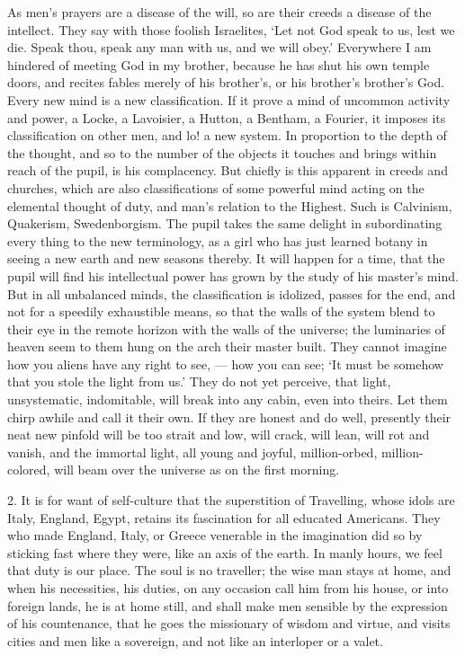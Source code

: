 \documentclass{article}
\begin{document}
As men's prayers are a disease of the will, so are their creeds a disease of
the intellect. They say with those foolish Israelites, `Let not God speak to
us, lest we die. Speak thou, speak any man with us, and we will obey.'
Everywhere I am hindered of meeting God in my brother, because he has shut
his own temple doors, and recites fables merely of his brother's, or his
brother's brother's God. Every new mind is a new classification. If it prove
a mind of uncommon activity and power, a Locke, a Lavoisier, a Hutton, a
Bentham, a Fourier, it imposes its classification on other men, and lo! a
new system. In proportion to the depth of the thought, and so to the number
of the objects it touches and brings within reach of the pupil, is his
complacency. But chiefly is this apparent in creeds and churches, which are
also classifications of some powerful mind acting on the elemental thought
of duty, and man's relation to the Highest. Such is Calvinism, Quakerism,
Swedenborgism. The pupil takes the same delight in subordinating every thing
to the new terminology, as a girl who has just learned botany in seeing a
new earth and new seasons thereby. It will happen for a time, that the pupil
will find his intellectual power has grown by the study of his master's
mind. But in all unbalanced minds, the classification is idolized, passes
for the end, and not for a speedily exhaustible means, so that the walls of
the system blend to their eye in the remote horizon with the walls of the
universe; the luminaries of heaven seem to them hung on the arch their
master built. They cannot imagine how you aliens have any right to see, ---
how you can see; `It must be somehow that you stole the light from us.' They
do not yet perceive, that light, unsystematic, indomitable, will break into
any cabin, even into theirs. Let them chirp awhile and call it their own. If
they are honest and do well, presently their neat new pinfold will be too
strait and low, will crack, will lean, will rot and vanish, and the immortal
light, all young and joyful, million-orbed, million-colored, will beam over
the universe as on the first morning.

2. It is for want of self-culture that the superstition of Travelling, whose
idols are Italy, England, Egypt, retains its fascination for all educated
Americans. They who made England, Italy, or Greece venerable in the
imagination did so by sticking fast where they were, like an axis of the
earth. In manly hours, we feel that duty is our place. The soul is no
traveller; the wise man stays at home, and when his necessities, his duties,
on any occasion call him from his house, or into foreign lands, he is at
home still, and shall make men sensible by the expression of his
countenance, that he goes the missionary of wisdom and virtue, and visits
cities and men like a sovereign, and not like an interloper or a valet.
\end{document}
